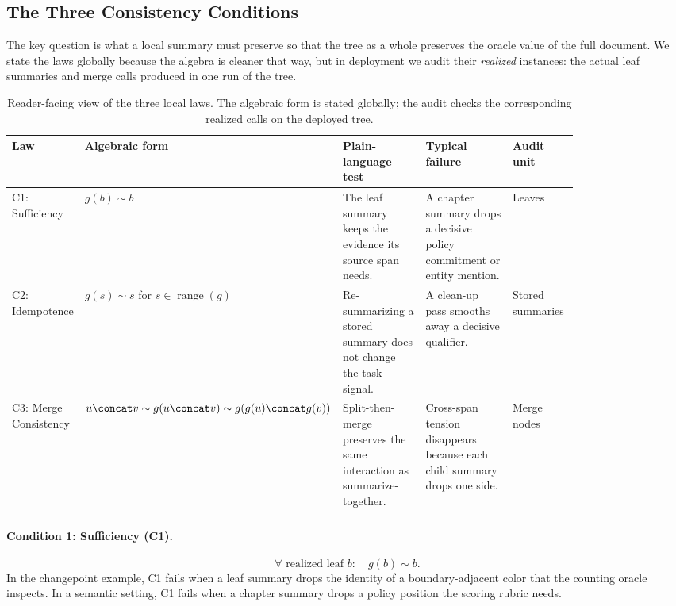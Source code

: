 \subsection{The Three Consistency Conditions}

The key question is what a local summary must preserve so that the tree as a whole preserves the oracle value of the full document. We state the laws globally because the algebra is cleaner that way, but in deployment we audit their \emph{realized} instances: the actual leaf summaries and merge calls produced in one run of the tree.

\begin{table}[t]
\centering\footnotesize
\setlength{\tabcolsep}{3pt}
\begin{tabular}{p{0.11\linewidth}p{0.18\linewidth}p{0.19\linewidth}p{0.22\linewidth}p{0.13\linewidth}}
\toprule
Law & Algebraic form & Plain-language test & Typical failure & Audit unit \\
\midrule
C1: Sufficiency & $g(b)\sim b$ & The leaf summary keeps the evidence its source span needs. & A chapter summary drops a decisive policy commitment or entity mention. & Leaves \\
C2: Idempotence & $g(s)\sim s$ for $s \in \operatorname{range}(g)$ & Re-summarizing a stored summary does not change the task signal. & A clean-up pass smooths away a decisive qualifier. & Stored summaries \\
C3: Merge Consistency & $u \concat v \sim g(u \concat v) \sim g(g(u)\concat g(v))$ & Split-then-merge preserves the same interaction as summarize-together. & Cross-span tension disappears because each child summary drops one side. & Merge nodes \\
\bottomrule
\end{tabular}
\caption{Reader-facing view of the three local laws. The algebraic form is stated globally; the audit checks the corresponding realized calls on the deployed tree.}
\label{tab:law-cards}
\end{table}

\paragraph{Condition 1: Sufficiency (C1).}
\begin{equation}\tag{C1}\label{eq:leaf_sufficiency}
\forall \text{ realized leaf } b:\quad g(b) \sim b.
\end{equation}
In the changepoint example, C1 fails when a leaf summary drops the identity of a boundary-adjacent color that the counting oracle inspects. In a semantic setting, C1 fails when a chapter summary drops a policy position the scoring rubric needs.

